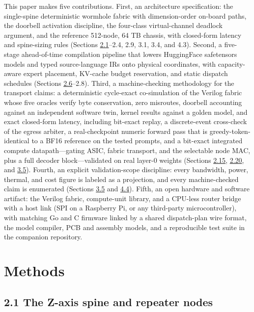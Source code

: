 \documentclass[10pt,twocolumn]{article}
\begin{document}
This paper makes five contributions. First, an architecture specification: the single-spine deterministic wormhole fabric with dimension-order on-board paths, the doorbell activation discipline, the four-class virtual-channel deadlock argument, and the reference 512-node, 64 TB chassis, with closed-form latency and spine-sizing rules (Sections \hyperref[sec:2.1]{2.1}--2.4, 2.9, 3.1, 3.4, and 4.3). Second, a five-stage ahead-of-time compilation pipeline that lowers HuggingFace safetensors models and typed source-language IRs onto physical coordinates, with capacity-aware expert placement, KV-cache budget reservation, and static dispatch schedules (Sections \hyperref[sec:2.6]{2.6}--2.8). Third, a machine-checking methodology for the transport claims: a deterministic cycle-exact co-simulation of the Verilog fabric whose five oracles verify byte conservation, zero misroutes, doorbell accounting against an independent software twin, kernel results against a golden model, and exact closed-form latency, including bit-exact replay, a discrete-event cross-check of the egress arbiter, a real-checkpoint numeric forward pass that is greedy-token-identical to a BF16 reference on the tested prompts, and a bit-exact integrated compute datapath---gating ASIC, fabric transport, and the selectable node MAC, plus a full decoder block---validated on real layer-0 weights (Sections \hyperref[sec:2.15]{2.15}, \hyperref[sec:2.20]{2.20}, and \hyperref[sec:3.5]{3.5}). Fourth, an explicit validation-scope discipline: every bandwidth, power, thermal, and cost figure is labeled as a projection, and every machine-checked claim is enumerated (Sections \hyperref[sec:3.5]{3.5} and \hyperref[sec:4.4]{4.4}). Fifth, an open hardware and software artifact: the Verilog fabric, compute-unit library, and a CPU-less router bridge with a host link (SPI on a Raspberry Pi, or any third-party microcontroller), with matching Go and C firmware linked by a shared dispatch-plan wire format, the model compiler, PCB and assembly models, and a reproducible test suite in the companion repository\cite{28}.

\section*{Methods}\label{sec:methods}

\subsection*{2.1 The Z-axis spine and repeater nodes}\label{sec:2.1}
\end{document}
